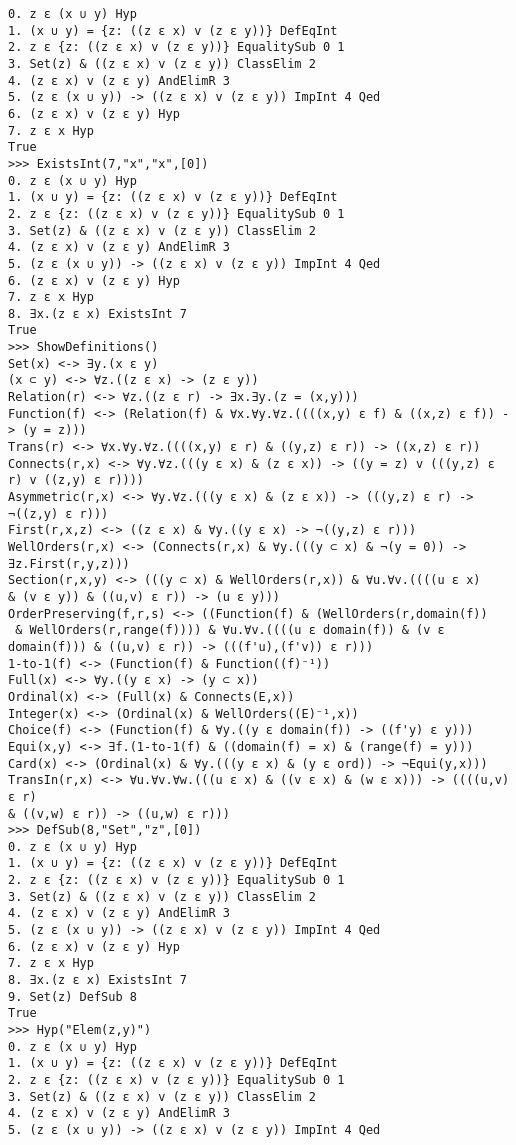 \documentclass[a4paper,12pt,leqno]{article}
\numberwithin{equation}{section}
\begin{document}
\begin{verbatim}
0. z ε (x ∪ y) Hyp 
1. (x ∪ y) = {z: ((z ε x) v (z ε y))} DefEqInt 
2. z ε {z: ((z ε x) v (z ε y))} EqualitySub 0 1
3. Set(z) & ((z ε x) v (z ε y)) ClassElim 2
4. (z ε x) v (z ε y) AndElimR 3
5. (z ε (x ∪ y)) -> ((z ε x) v (z ε y)) ImpInt 4 Qed
6. (z ε x) v (z ε y) Hyp 
7. z ε x Hyp 
True
>>> ExistsInt(7,"x","x",[0])
0. z ε (x ∪ y) Hyp 
1. (x ∪ y) = {z: ((z ε x) v (z ε y))} DefEqInt 
2. z ε {z: ((z ε x) v (z ε y))} EqualitySub 0 1
3. Set(z) & ((z ε x) v (z ε y)) ClassElim 2
4. (z ε x) v (z ε y) AndElimR 3
5. (z ε (x ∪ y)) -> ((z ε x) v (z ε y)) ImpInt 4 Qed
6. (z ε x) v (z ε y) Hyp 
7. z ε x Hyp 
8. ∃x.(z ε x) ExistsInt 7
True
>>> ShowDefinitions()
Set(x) <-> ∃y.(x ε y)
(x ⊂ y) <-> ∀z.((z ε x) -> (z ε y))
Relation(r) <-> ∀z.((z ε r) -> ∃x.∃y.(z = (x,y)))
Function(f) <-> (Relation(f) & ∀x.∀y.∀z.((((x,y) ε f) & ((x,z) ε f)) -> (y = z)))
Trans(r) <-> ∀x.∀y.∀z.((((x,y) ε r) & ((y,z) ε r)) -> ((x,z) ε r))
Connects(r,x) <-> ∀y.∀z.(((y ε x) & (z ε x)) -> ((y = z) v (((y,z) ε r) v ((z,y) ε r))))
Asymmetric(r,x) <-> ∀y.∀z.(((y ε x) & (z ε x)) -> (((y,z) ε r) -> ¬((z,y) ε r)))
First(r,x,z) <-> ((z ε x) & ∀y.((y ε x) -> ¬((y,z) ε r)))
WellOrders(r,x) <-> (Connects(r,x) & ∀y.(((y ⊂ x) & ¬(y = 0)) -> ∃z.First(r,y,z)))
Section(r,x,y) <-> (((y ⊂ x) & WellOrders(r,x)) & ∀u.∀v.((((u ε x) 
& (v ε y)) & ((u,v) ε r)) -> (u ε y)))
OrderPreserving(f,r,s) <-> ((Function(f) & (WellOrders(r,domain(f))
 & WellOrders(r,range(f)))) & ∀u.∀v.((((u ε domain(f)) & (v ε domain(f))) & ((u,v) ε r)) -> (((f'u),(f'v)) ε r)))
1-to-1(f) <-> (Function(f) & Function((f)⁻¹))
Full(x) <-> ∀y.((y ε x) -> (y ⊂ x))
Ordinal(x) <-> (Full(x) & Connects(E,x))
Integer(x) <-> (Ordinal(x) & WellOrders((E)⁻¹,x))
Choice(f) <-> (Function(f) & ∀y.((y ε domain(f)) -> ((f'y) ε y)))
Equi(x,y) <-> ∃f.(1-to-1(f) & ((domain(f) = x) & (range(f) = y)))
Card(x) <-> (Ordinal(x) & ∀y.(((y ε x) & (y ε ord)) -> ¬Equi(y,x)))
TransIn(r,x) <-> ∀u.∀v.∀w.(((u ε x) & ((v ε x) & (w ε x))) -> ((((u,v) ε r) 
& ((v,w) ε r)) -> ((u,w) ε r)))
>>> DefSub(8,"Set","z",[0])
0. z ε (x ∪ y) Hyp 
1. (x ∪ y) = {z: ((z ε x) v (z ε y))} DefEqInt 
2. z ε {z: ((z ε x) v (z ε y))} EqualitySub 0 1
3. Set(z) & ((z ε x) v (z ε y)) ClassElim 2
4. (z ε x) v (z ε y) AndElimR 3
5. (z ε (x ∪ y)) -> ((z ε x) v (z ε y)) ImpInt 4 Qed
6. (z ε x) v (z ε y) Hyp 
7. z ε x Hyp 
8. ∃x.(z ε x) ExistsInt 7
9. Set(z) DefSub 8
True
>>> Hyp("Elem(z,y)")
0. z ε (x ∪ y) Hyp 
1. (x ∪ y) = {z: ((z ε x) v (z ε y))} DefEqInt 
2. z ε {z: ((z ε x) v (z ε y))} EqualitySub 0 1
3. Set(z) & ((z ε x) v (z ε y)) ClassElim 2
4. (z ε x) v (z ε y) AndElimR 3
5. (z ε (x ∪ y)) -> ((z ε x) v (z ε y)) ImpInt 4 Qed

\end{verbatim}
\end{document}
